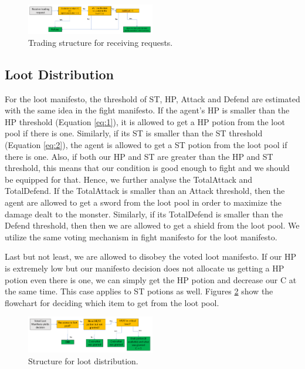 \begin{figure}
    \centering
    \includegraphics[width=0.5\textwidth]{007_team_4_agent_design/figures/3_trading_receive_2.png}
    \caption{Trading structure for receiving requests.}
    \label{fig:traderec}
\end{figure}

\subsection{Loot Distribution}

\par For the loot manifesto, the threshold of ST, HP, Attack and Defend are estimated with the same idea in the fight manifesto. If the agent's HP is smaller than the HP threshold (Equation \ref{eq:1}), it is allowed to get a HP potion from the loot pool if there is one. Similarly, if its ST is smaller than the ST threshold (Equation \ref{eq:2}), the agent is allowed to get a ST potion from the loot pool if there is one. Also, if both our HP and ST are greater than the HP and ST threshold, this means that our condition is good enough to fight and we should be equipped for that. Hence, we further analyse the TotalAttack and TotalDefend. If the TotalAttack is smaller than an Attack threshold, then the agent are allowed to get a sword from the loot pool in order to maximize the damage dealt to the monster. Similarly, if its TotalDefend is smaller than the Defend threshold, then then we are allowed to get a shield from the loot pool. We utilize the same voting mechanism in fight manifesto for the loot manifesto.

\par Last but not least, we are allowed to disobey the voted loot manifesto. If our HP is extremely low but our manifesto decision does not allocate us  getting a HP potion even there is one, we can simply get the HP potion and decrease our C at the same time. This case applies to ST potions as well. Figures \ref{fig:lootdist} show the flowchart for deciding which item to get from the loot pool.

\begin{figure}
    \centering
    \includegraphics[width=0.5\textwidth]{007_team_4_agent_design/figures/5_loot.png}
    \caption{Structure for loot distribution.}
    \label{fig:lootdist}
\end{figure}

